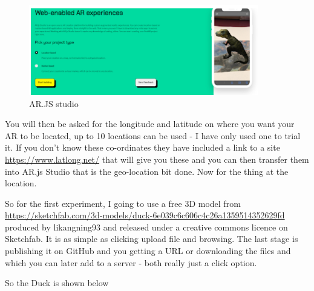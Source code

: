 \begin{figure}
    \centering
    \includegraphics[width=10cm]{chapters/ChapterAR/webar1.png}
    \caption{AR.JS studio}
    \label{fig:arjsstudio}
\end{figure}
 
 You will then be asked for the longitude and latitude on where you want your AR to be located, up to 10 locations can be used - I have only used one to trial it. If you don't know these co-ordinates they have included a link to a site \url{https://www.latlong.net/}  that will give you these and you can then transfer them into AR.js Studio that is the geo-location bit done. Now for the thing at the location.
 
 
So for the first experiment, I going to use a free 3D model from \url{https://sketchfab.com/3d-models/duck-6e039c6c606c4c26a1359514352629fd}  produced by likangning93 and released under a creative commons licence on Sketchfab. It is as simple as clicking upload file and browsing. The last stage is publishing it on GitHub and you getting a URL or downloading the files and which you can later add to a server - both really just a click option. 

So the Duck is shown below 


